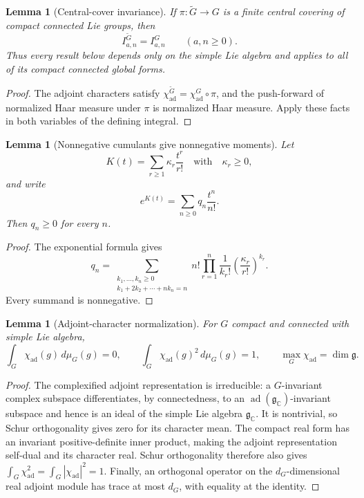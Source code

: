 \documentclass[11pt,reqno]{amsart}
\theoremstyle{plain}
\newtheorem{lemma}[theorem]{Lemma}
\theoremstyle{definition}
\newcommand{\chiad}{\chi_{\mathrm{ad}}}
\begin{document}
\begin{lemma}[Central-cover invariance]\label{lem:full-central-cover}
If $\pi:\widetilde G\to G$ is a finite central covering of compact connected
Lie groups, then
\[
 I^{\widetilde G}_{a,n}=I^G_{a,n}
 \qquad(a,n\geq0).
\]
Thus every result below depends only on the simple Lie algebra and applies to
all of its compact connected global forms.
\end{lemma}

\begin{proof}
The adjoint characters satisfy
$\chiad^{\widetilde G}=\chiad^G\circ\pi$, and the push-forward of normalized
Haar measure under $\pi$ is normalized Haar measure.  Apply these facts in
both variables of the defining integral.
\end{proof}

\begin{lemma}[Nonnegative cumulants give nonnegative moments]
\label{lem:nonnegative-cumulants}
Let
\[
 K(t)=\sum_{r\geq1}\kappa_r\frac{t^r}{r!}
 \quad\text{with}\quad \kappa_r\geq0,
\]
and write
\[
 e^{K(t)}=\sum_{n\geq0}q_n\frac{t^n}{n!}.
\]
Then $q_n\geq0$ for every $n$.
\end{lemma}

\begin{proof}
The exponential formula gives
\[
 q_n=\sum_{\substack{k_1,\ldots,k_n\geq0\\
                      k_1+2k_2+\cdots+nk_n=n}}
 n!\prod_{r=1}^{n}
 \frac1{k_r!}\left(\frac{\kappa_r}{r!}\right)^{k_r}.
\]
Every summand is nonnegative.
\end{proof}

\begin{lemma}[Adjoint-character normalization]\label{lem:adjoint-normalization}
For $G$ compact and connected with simple Lie algebra,
\[
 \int_G\chiad(g)\,d\mu_G(g)=0,
 \qquad
 \int_G\chiad(g)^2\,d\mu_G(g)=1,
 \qquad
 \max_G\chiad=\dim\mathfrak g.
\]
\end{lemma}

\begin{proof}
The complexified adjoint representation is irreducible: a
$G$-invariant complex subspace differentiates, by connectedness, to an
$\operatorname{ad}(\mathfrak g_{\mathbb C})$-invariant subspace and hence is
an ideal of the simple Lie algebra $\mathfrak g_{\mathbb C}$.  It is
nontrivial, so Schur orthogonality gives zero for its character mean.  The
compact real form has an invariant positive-definite inner product, making
the adjoint representation self-dual and its character real.  Schur
orthogonality therefore also gives
$\int_G\chiad^2=\int_G|\chiad|^2=1$.  Finally, an orthogonal operator on the
$d_G$-dimensional real adjoint module has trace at most $d_G$, with equality
at the identity.
\end{proof}
\end{document}
